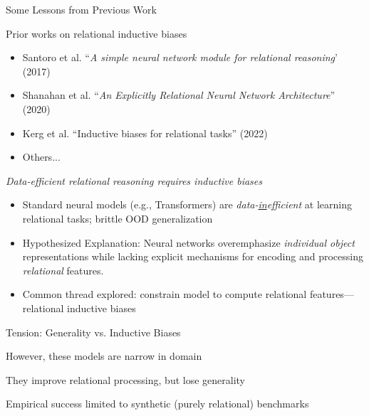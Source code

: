 \documentclass[xcolor={dvipsnames}]{beamer}
\begin{document}
\begin{frame}{Some Lessons from Previous Work}
    \tiny{
    Prior works on relational inductive biases
    \begin{itemize}
        \item Santoro et al. ``\textit{A simple neural network module for relational reasoning}' (2017)
        \item Shanahan et al. ``\textit{An Explicitly Relational Neural Network Architecture}'' (2020)
        \item Kerg et al. ``Inductive biases for relational tasks'' (2022)
        \item Others...
    \end{itemize}
    }
    \normalsize
    \begin{center}
        \emph{\alert{Data-efficient relational reasoning requires inductive biases}}
    \end{center}

    \begin{itemize}
        \item Standard neural models (e.g., Transformers) are \alert{\emph{data-\underline{in}efficient}} at learning relational tasks; brittle OOD generalization
        \item \alert{Hypothesized Explanation:} Neural networks overemphasize \emph{individual object} representations while lacking explicit mechanisms for encoding and processing \emph{relational} features.
        \item \alert{Common thread explored:} constrain model to compute relational features---relational inductive biases
    \end{itemize}
\end{frame}

\begin{frame}{Tension: Generality vs. Inductive Biases}

    \alert{However}, these models are narrow in domain

    They improve relational processing, but \alert{lose generality}

    Empirical success limited to synthetic (purely relational) benchmarks
\end{frame}
\end{document}
